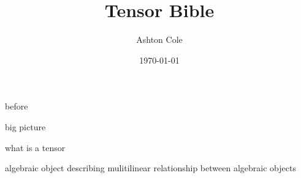 \documentclass{book}
\title{Tensor Bible}
\author{Ashton Cole}
\date{\today}
\begin{document}
	
\frontmatter

\maketitle

\tableofcontents

\listoftheorems

\mainmatter



before

big picture

what is a tensor

algebraic object describing mulitilinear relationship between algebraic objects





\appendix


\end{document}
